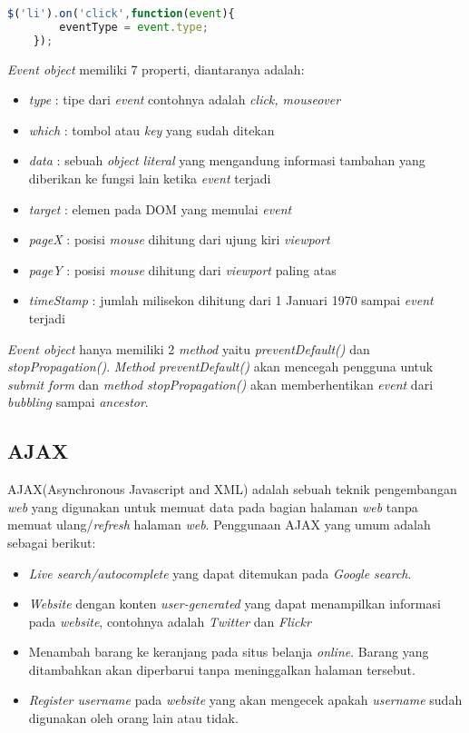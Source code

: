 \begin{lstlisting}[language=Javascript, caption=Mendapatkan tipe \textit{event} dari \textit{event object}, label={lst:jQuery11}]
	$('li').on('click',function(event){
		eventType = event.type;
	});
\end{lstlisting}

\textit{Event object} memiliki 7 properti, diantaranya adalah:

\begin{itemize}
	\item \textit{type} : tipe dari \textit{event} contohnya adalah \textit{click, mouseover}
	\item \textit{which} : tombol atau \textit{key} yang sudah ditekan
	\item \textit{data} : sebuah \textit{object literal} yang mengandung informasi tambahan yang diberikan ke fungsi lain ketika \textit{event} terjadi
	\item \textit{target} : elemen pada DOM yang memulai \textit{event}
	\item \textit{pageX} : posisi \textit{mouse} dihitung dari ujung kiri \textit{viewport} 
	\item \textit{pageY} : posisi \textit{mouse} dihitung dari \textit{viewport} paling atas
	\item \textit{timeStamp} : jumlah milisekon dihitung dari 1 Januari 1970 sampai \textit{event} terjadi
\end{itemize}

\textit{Event object} hanya memiliki 2 \textit{method} yaitu \textit{preventDefault()} dan \textit{stopPropagation()}. \textit{Method preventDefault()} akan mencegah pengguna untuk \textit{submit form} dan \textit{method stopPropagation()} akan memberhentikan \textit{event} dari \textit{bubbling} sampai \textit{ancestor}.

\subsection{AJAX}
AJAX(Asynchronous Javascript and XML) adalah sebuah teknik pengembangan \textit{web} yang digunakan untuk memuat data pada bagian halaman \textit{web} tanpa memuat ulang/\textit{refresh} halaman \textit{web}. Penggunaan AJAX yang umum adalah sebagai berikut:

\begin{itemize}
	\item \textit{Live search/autocomplete} yang dapat ditemukan pada \textit{Google search}.
	\item \textit{Website} dengan konten \textit{user-generated} yang dapat menampilkan informasi pada \textit{website}, contohnya adalah \textit{Twitter} dan \textit{Flickr}
	\item Menambah barang ke keranjang pada situs belanja \textit{online}. Barang yang ditambahkan akan diperbarui tanpa meninggalkan halaman tersebut.
	\item \textit{Register username} pada \textit{website} yang akan mengecek apakah \textit{username} sudah digunakan oleh orang lain atau tidak.
\end{itemize}

